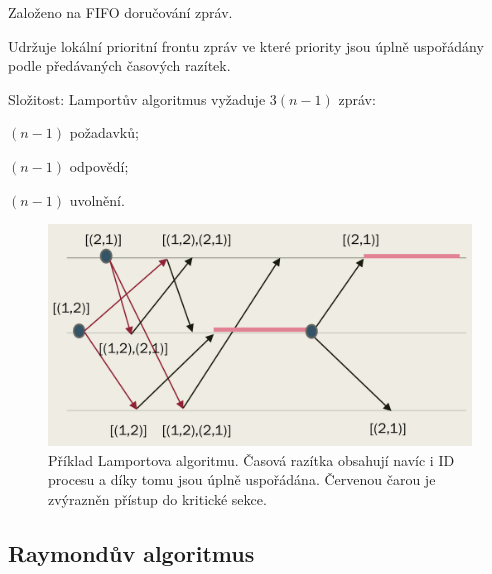 \begin{compactitem}
    \item Založeno na FIFO doručování zpráv.
    \item Udržuje lokální prioritní frontu zpráv ve které priority jsou úplně uspořádány podle předávaných časových razítek.

    \item Složitost: Lamportův algoritmus vyžaduje $3(n-1)$ zpráv: \begin{compactitem}
        \item $(n-1)$ požadavků;
        \item $(n-1)$ odpovědí;
        \item $(n-1)$ uvolnění.
    \end{compactitem}

    \begin{figure}[H]
        \centering
        \includegraphics[width=1\linewidth]{lamportuv_algoritmus.pdf}
        \caption{Příklad Lamportova algoritmu. Časová razítka obsahují navíc i ID procesu a díky tomu jsou úplně uspořádána. Červenou čarou je zvýrazněn přístup do kritické sekce.}
    \end{figure}
\end{compactitem}

\subsection{Raymondův algoritmus}

